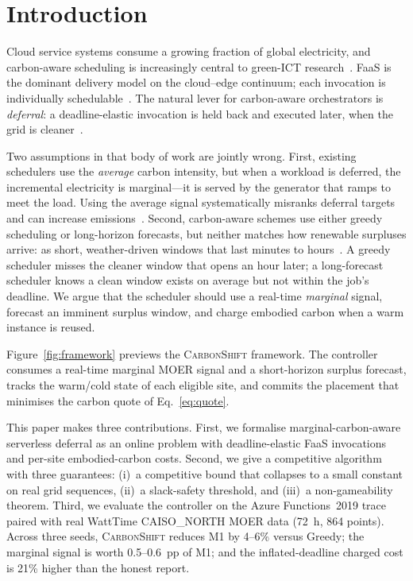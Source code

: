 \section{Introduction}
\label{sec:intro}

Cloud service systems consume a growing fraction of global electricity, and carbon-aware scheduling is increasingly central to green-ICT research~\cite{patel2024modeling,gill2024modern}. FaaS is the dominant delivery model on the cloud--edge continuum; each invocation is individually schedulable~\cite{calavaro2025beyond,russo2024qosaware}. The natural lever for carbon-aware orchestrators is \emph{deferral}: a deadline-elastic invocation is held back and executed later, when the grid is cleaner~\cite{asadov2025carbonaware,patel2024agile,gsteiger2024caribou}.

Two assumptions in that body of work are jointly wrong. First, existing schedulers use the \emph{average} carbon intensity, but when a workload is deferred, the incremental electricity is marginal---it is served by the generator that ramps to meet the load. Using the average signal systematically misranks deferral targets and can increase emissions~\cite{sukprasert2024implications,maji2024green}. Second, carbon-aware schemes use either greedy scheduling or long-horizon forecasts, but neither matches how renewable surpluses arrive: as short, weather-driven windows that last minutes to hours~\cite{chen2024towards}. A greedy scheduler misses the cleaner window that opens an hour later; a long-forecast scheduler knows a clean window exists on average but not within the job's deadline. We argue that the scheduler should use a real-time \emph{marginal} signal, forecast an imminent surplus window, and charge embodied carbon when a warm instance is reused.


Figure~\ref{fig:framework} previews the \textsc{CarbonShift} framework. The controller consumes a real-time marginal MOER signal and a short-horizon surplus forecast, tracks the warm/cold state of each eligible site, and commits the placement that minimises the carbon quote of Eq.~\eqref{eq:quote}.

This paper makes three contributions. First, we formalise marginal-carbon-aware serverless deferral as an online problem with deadline-elastic FaaS invocations and per-site embodied-carbon costs. Second, we give a competitive algorithm with three guarantees: (i)~a competitive bound that collapses to a small constant on real grid sequences, (ii)~a slack-safety threshold, and (iii)~a non-gameability theorem. Third, we evaluate the controller on the Azure Functions~2019 trace paired with real WattTime CAISO\_NORTH MOER data (72~h, 864 points). Across three seeds, \textsc{CarbonShift} reduces M1 by 4--6\% versus Greedy; the marginal signal is worth 0.5--0.6~pp of M1; and the inflated-deadline charged cost is 21\% higher than the honest report.
